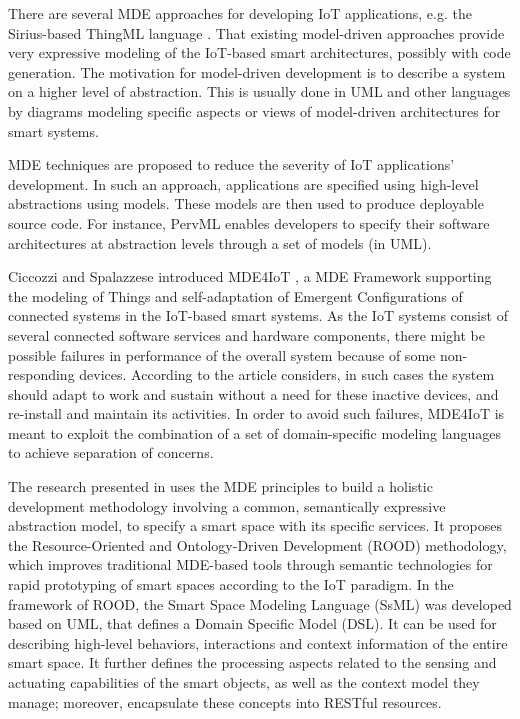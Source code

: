 There are several MDE approaches for developing IoT applications, e.g. the Sirius-based ThingML language \cite{Fleurey+2011+1}. That existing model-driven approaches provide very expressive modeling of the IoT-based smart architectures, possibly with code generation. The motivation for model-driven development is to describe a system on a higher level of abstraction. This is usually done in UML and other languages by diagrams modeling specific aspects or views of model-driven architectures for smart systems.

MDE techniques are proposed to reduce the severity of IoT applications' development. In such an approach, applications are specified using high-level abstractions using models. These models are then used to produce deployable source code. For instance, PervML \cite{serral2010towards} enables developers to specify their software architectures at abstraction levels through a set of models (in UML).

Ciccozzi and Spalazzese introduced MDE4IoT \cite{ciccozzi2016mde4iot}, a MDE Framework supporting the modeling of Things and self-adaptation of Emergent Configurations of connected systems in the IoT-based smart systems. As the IoT systems consist of several connected software services and hardware components, there might be possible failures in performance of the overall system because of some non-responding devices. According to the article considers, in such cases the system should adapt to work and sustain without a need for these inactive devices, and re-install and maintain its activities. In order to avoid such failures, MDE4IoT is meant to exploit the combination of a set of domain-specific modeling languages to achieve separation of concerns.

The research presented in \cite{Corredor+2012} uses the MDE principles to build a holistic development methodology involving a common, semantically expressive abstraction model, to specify a smart space with its specific services. It proposes the Resource-Oriented and Ontology-Driven Development (ROOD) methodology, which improves traditional MDE-based tools through semantic technologies for rapid prototyping of smart spaces according to the IoT paradigm. In the framework of ROOD, the Smart Space Modeling Language (SsML) was developed based on UML, that defines a Domain Specific Model (DSL). It can be used for describing high-level behaviors, interactions and context information of the entire smart space. It further defines the processing aspects related to the sensing and actuating capabilities of the smart objects, as well as the context model they manage; moreover, encapsulate these concepts into RESTful resources.

